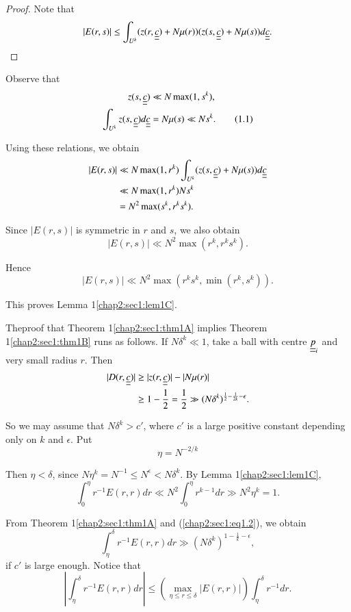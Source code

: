 \begin{proof}
Note that
$$
|E(r, s)| \leq \int_{U^{k}} (z(r, \underline{\underline{c}}) + N\mu(r))(z(s, \underline{\underline{c}}) + N\mu(s))d \underline{\underline{c}}.
$$
\end{proof}

Observe that
\begin{align*}
z(s, \underline{\underline{c}}) & \ll N \max (1, s^{k}),\\
\int_{U^{k}} z(s, \underline{\underline{c}}) d \underline{\underline{c}} & = N\mu(s) \ll N s^{k}.\tag{1.1}\label{chap2:sec1:eq1.1} 
\end{align*}

Using these relations, we obtain
\begin{align*}
|E(r, s)| & \ll N \max (1, r^{k}) \int_{U^{k}} (z(s, \underline{\underline{c}}) + N\mu(s)) d \underline{\underline{c}}\\
& \ll N \max (1, r^{k}) N s^{k}\\
& = N^{2} \max (s^{k}, r^{k} s^{k}).
\end{align*}

Since $|E(r, s)|$ is symmetric in $r$ and $s$, we also obtain
$$
|E(r, s)| \ll N^{2} \max (r^{k}, r^{k} s^{k}).
$$

Hence
$$
|E(r, s)| \ll N^{2} \max (r^{k} s^{k}, \min (r^{k}, s^{k})).
$$

This proves Lemma 1\ref{chap2:sec1:lem1C}.

The\pageoriginale proof that Theorem 1\ref{chap2:sec1:thm1A} implies Theorem 1\ref{chap2:sec1:thm1B} runs as follows. If $N \delta^{k} \ll 1$, take a ball with centre $\underline{\underline{p}}_{i}$ and very small radius $r$. Then
\begin{align*}
|D(r, \underline{\underline{c}})| & \geq |z(r, \underline{\underline{c}})| - |N\mu(r)|\\
& \geq 1 - \frac{1}{2} = \frac{1}{2} \gg (N \delta^{k})^{\frac{1}{2} - \frac{1}{2k} - \epsilon}.
\end{align*}

So we may assume that $N \delta^{k} > c'$, where $c'$ is a large positive constant depending only on $k$ and $\epsilon$. Put
$$
\eta = N^{-2/k}
$$

Then $\eta < \delta$, since $N \eta^{k} = N^{-1} \leq N^{\epsilon} < N \delta^{k}$. By Lemma 1\ref{chap2:sec1:lem1C},
\begin{equation*}
\int_{0}^{\eta} r^{-1} E(r, r)dr \ll N^{2} \int_{0}^{\eta} r^{k-1} dr \gg N^{2} \eta^{k} = 1.\tag{1.2}\label{chap2:sec1:eq1.2}
\end{equation*}

From Theorem 1\ref{chap2:sec1:thm1A} and (\ref{chap2:sec1:eq1.2}), we obtain
\begin{equation*}
\int_{\eta}^{\delta} r^{-1} E(r, r)dr \gg (N \delta^{k})^{1 - \frac{1}{k} - \epsilon},\tag{1.3}\label{chap2:sec1:eq1.3}
\end{equation*}
if $c'$ is large enough. Notice that
\begin{equation*}
\left|\int_{\eta}^{\delta} r^{-1} E(r, r) dr\right| \leq (\max_{\eta \leq r \leq \delta} |E(r, r)|) \int_{\eta}^{\delta} r^{-1} dr.\tag{1.4}\label{chap2:sec1:eq1.4}  
\end{equation*}

